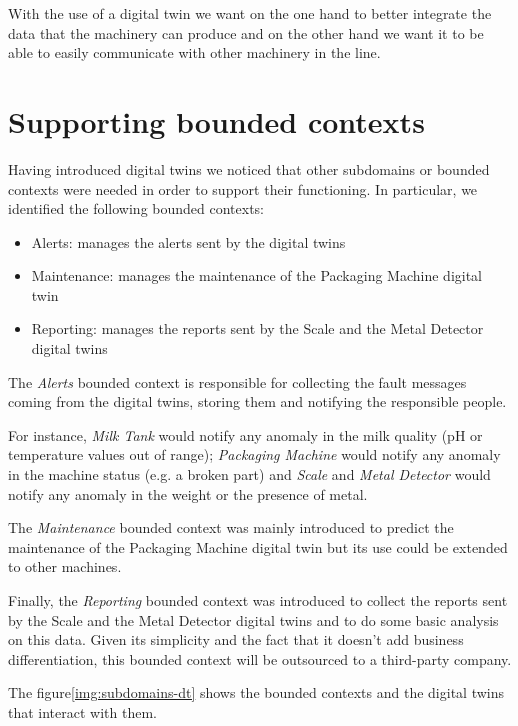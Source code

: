 With the use of a digital twin we want on the one hand to better integrate the data that the machinery can produce and on the other hand we
want it to be able to easily communicate with other machinery in the line.

\section{Supporting bounded contexts}
Having introduced digital twins we noticed that other subdomains or bounded contexts were needed in order to support their functioning.
In particular, we identified the following bounded contexts:
\begin{itemize}
    \item Alerts: manages the alerts sent by the digital twins
    \item Maintenance: manages the maintenance of the Packaging Machine digital twin
    \item Reporting: manages the reports sent by the Scale and the Metal Detector digital twins
\end{itemize}

The \textit{Alerts} bounded context is responsible for collecting the fault messages coming from the digital twins, storing them and notifying the responsible people.

For instance, \textit{Milk Tank} would notify any anomaly in the milk quality (pH or temperature values out of range);
\textit{Packaging Machine} would notify any anomaly in the machine status (e.g. a broken part) and \textit{Scale} and \textit{Metal Detector} would notify any anomaly in the weight or the presence of metal.

The \textit{Maintenance} bounded context was mainly introduced to predict the maintenance of the Packaging Machine digital twin but its use could be extended to other machines.

Finally, the \textit{Reporting} bounded context was introduced to collect the reports sent by the Scale and the Metal Detector digital twins and to do some basic analysis on this data.
Given its simplicity and the fact that it doesn't add business differentiation, this bounded context will be outsourced to a third-party company.

The figure\ref{img:subdomains-dt} shows the bounded contexts and the digital twins that interact with them.

